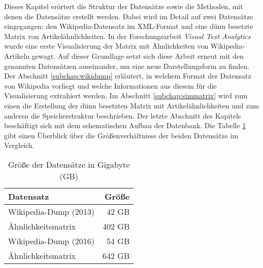 
Dieses Kapitel erörtert die Struktur der Datensätze sowie die Methoden, mit denen die Datensätze erstellt werden.
Dabei wird im Detail auf zwei Datensätze eingegangen: den Wikipedia-Datensatz im XML-Format und eine dünn besetzte Matrix von Artikelähnlichkeiten.
In der Forschungsarbeit \emph{Visual Text Analytics} wurde eine erste Visualisierung der Matrix mit Ähnlichkeiten von Wikipedia-Artikeln gewagt.
Auf dieser Grundlage setzt sich diese Arbeit erneut mit den genannten Datensätzen auseinander, um eine neue Darstellungsform zu finden.
Der Abschnitt \ref{subchap:wikidump} erläutert, in welchem Format der Datensatz von Wikipedia vorliegt und welche Informationen aus diesem für die Visualisierung extrahiert werden.
Im Abschnitt \ref{subchap:simmatrix} wird zum einen die Erstellung der dünn besetzten Matrix mit Artikelähnlichkeiten und zum anderen die Speicherstruktur beschrieben.
Der letzte Abschnitt des Kapitels beschäftigt sich mit dem schematischen Aufbau der Datenbank.
Die Tabelle \ref{tab:dataset-size} gibt einen Überblick über die Größenverhältnisse der beiden Datensätze im Vergleich.


\begin{table}[h]
\centering
\begin{tabular}{l r}
  \hline
  Datensatz & Größe \\
  \hline
  Wikipedia-Dump (2013) & 42 GB \\
  Ähnlichkeitsmatrix \cite{riehmann2016visualizing} & 402 GB\\
  Wikipedia-Dump (2016) & 54 GB \\
  Ähnlichkeitsmatrix \cite{licht:2017} & 642 GB \\
  \hline
\end{tabular}
\caption{Größe der Datensätze in Gigabyte (GB)}
\label{tab:dataset-size}
\end{table}



